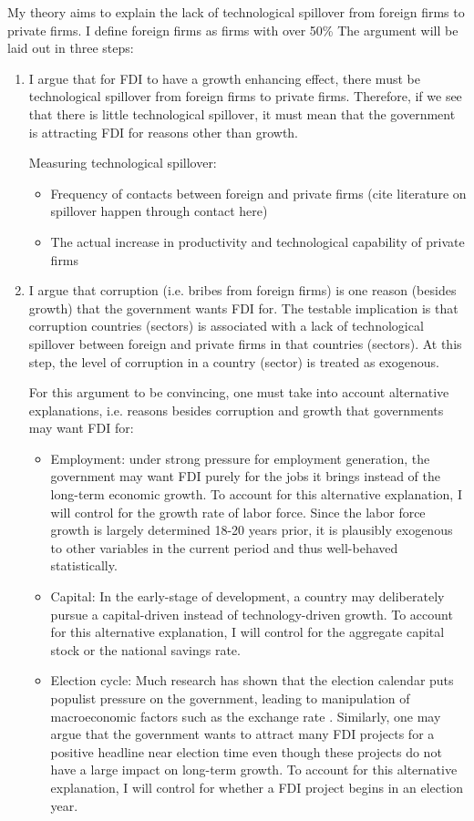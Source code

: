 My theory aims to explain the lack of technological spillover from foreign firms to private firms. I define foreign firms as firms with over 50\% The argument will be laid out in three steps:

\begin{enumerate}
\item I argue that for FDI to have a growth enhancing effect, there must be technological spillover from foreign firms to private firms. Therefore, if we see that there is little technological spillover, it must mean that the government is attracting FDI for reasons other than growth.

Measuring technological spillover:
\begin{itemize}
\item Frequency of contacts between foreign and private firms (cite literature on spillover happen through contact here)
\item The actual increase in productivity and technological capability of private firms
\end{itemize}


\item I argue that corruption (i.e. bribes from foreign firms) is one reason (besides growth) that the government wants FDI for. The testable implication is that corruption countries (sectors) is associated with a lack of technological spillover between foreign and private firms in that countries (sectors). At this step, the level of corruption in a country (sector) is treated as exogenous.

For this argument to be convincing, one must take into account alternative explanations, i.e. reasons besides corruption and growth that governments may want FDI for:
\begin{itemize} 
\item Employment: under strong pressure for employment generation, the government may want FDI purely for the jobs it brings instead of the long-term economic growth. To account for this alternative explanation, I will control for the growth rate of labor force. Since the labor force growth is largely determined 18-20 years prior, it is plausibly exogenous to other variables in the current period and thus well-behaved statistically.  
\item Capital: In the early-stage of development, a country may deliberately pursue a capital-driven instead of technology-driven growth. To account for this alternative explanation, I will control for the aggregate capital stock or the national savings rate.
\item Election cycle: Much research has shown that the election calendar puts populist pressure on the government, leading to manipulation of macroeconomic factors such as the exchange rate \citep{Blomberg2001}. Similarly, one may argue that the government wants to attract many FDI projects for a positive headline near election time even though these projects do not have a large impact on long-term growth. To account for this alternative explanation, I will control for whether a FDI project begins in an election year.
\end{itemize}


\end{enumerate}

